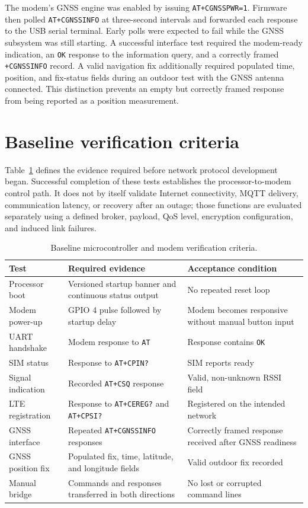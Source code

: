 The modem's GNSS engine was enabled by issuing \texttt{AT+CGNSSPWR=1}. Firmware then polled \texttt{AT+CGNSSINFO} at three-second intervals and forwarded each response to the USB serial terminal. Early polls were expected to fail while the GNSS subsystem was still starting. A successful interface test required the modem-ready indication, an \texttt{OK} response to the information query, and a correctly framed \texttt{+CGNSSINFO} record. A valid navigation fix additionally required populated time, position, and fix-status fields during an outdoor test with the GNSS antenna connected. This distinction prevents an empty but correctly framed response from being reported as a position measurement.

\section{Baseline verification criteria}

Table~\ref{tab:baseline-criteria} defines the evidence required before network protocol development began. Successful completion of these tests establishes the processor-to-modem control path. It does not by itself validate Internet connectivity, MQTT delivery, communication latency, or recovery after an outage; those functions are evaluated separately using a defined broker, payload, QoS level, encryption configuration, and induced link failures.

\begin{table}[ht]
\centering
\caption{Baseline microcontroller and modem verification criteria.}
\label{tab:baseline-criteria}
\begin{tabular}{|p{3.2cm}|p{4.6cm}|p{4.6cm}|}
\hline
\textbf{Test} & \textbf{Required evidence} & \textbf{Acceptance condition} \\ \hline
Processor boot & Versioned startup banner and continuous status output & No repeated reset loop \\ \hline
Modem power-up & GPIO 4 pulse followed by startup delay & Modem becomes responsive without manual button input \\ \hline
UART handshake & Modem response to \texttt{AT} & Response contains \texttt{OK} \\ \hline
SIM status & Response to \texttt{AT+CPIN?} & SIM reports ready \\ \hline
Signal indication & Recorded \texttt{AT+CSQ} response & Valid, non-unknown RSSI field \\ \hline
LTE registration & Response to \texttt{AT+CEREG?} and \texttt{AT+CPSI?} & Registered on the intended network \\ \hline
GNSS interface & Repeated \texttt{AT+CGNSSINFO} responses & Correctly framed response received after GNSS readiness \\ \hline
GNSS position fix & Populated fix, time, latitude, and longitude fields & Valid outdoor fix recorded \\ \hline
Manual bridge & Commands and responses transferred in both directions & No lost or corrupted command lines \\ \hline
\end{tabular}
\end{table}

